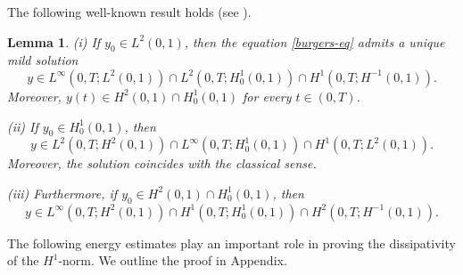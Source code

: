 \documentclass[review]{elsarticle}
\newtheorem{lemma}[theorem]{Lemma}
\numberwithin{equation}{section}
\begin{document}
The following well-known result holds (see \cite{S}).
\begin{lemma}
    (i) If $y_0\in L^2(0,1)$, then the equation \eqref{burgers-eq} admits a unique mild solution 
        \begin{equation*}
            \label{Burgers-wellposed1}
            y\in L^{\infty}(0,T;L^2(0,1))\cap L^2(0,T;H^1_0(0,1))\cap H^1(0,T;H^{-1}(0,1)).
        \end{equation*}
        Moreover, $y(t)\in H^2(0,1)\cap H^1_0(0,1)$ for every $t\in (0,T)$.
        
         (ii) If $y_0\in H^1_0(0,1)$, then 
         \begin{equation*}
            \label{Burgers-wellposed3}
            y\in L^{2}(0,T;H^2(0,1))\cap L^{\infty}(0,T;H^1_0(0,1))\cap H^1(0,T;L^2(0,1)).
        \end{equation*}
        Moreover, the solution coincides with the classical sense.
        
      (iii) Furthermore, if $y_0\in H^2(0,1)\cap H^1_0(0,1)$, then 
         \begin{equation*}
            \label{Burgers-wellposed4}
            y\in L^{\infty}(0,T;H^2(0,1))\cap H^1(0,T;H^1_0(0,1))\cap H^2(0,T;H^{-1}(0,1)).
        \end{equation*}
\end{lemma}

The following energy estimates play an important role in proving the dissipativity of the \(H^1\)-norm. We outline the proof in {Appendix}.
\end{document}
